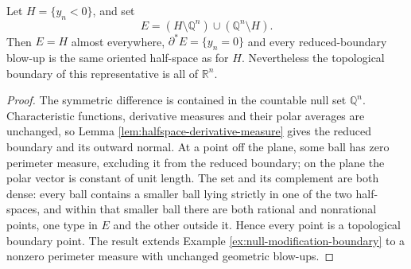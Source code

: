 \begin{example}\label{ex:halfspace-dense-modification}
Let $H=\{y_n<0\}$, and set
\[
 E=(H\setminus\mathbb Q^n)\cup(\mathbb Q^n\setminus H).
\]
Then $E=H$ almost everywhere, $\partial^*E=\{y_n=0\}$ and every reduced-boundary blow-up is the same oriented half-space as for $H$. Nevertheless the topological boundary of this representative is all of $\mathbb R^n$.
\end{example}
\begin{proof}
The symmetric difference is contained in the countable null set $\mathbb Q^n$. Characteristic functions, derivative measures and their polar averages are unchanged, so Lemma \ref{lem:halfspace-derivative-measure} gives the reduced boundary and its outward normal. At a point off the plane, some ball has zero perimeter measure, excluding it from the reduced boundary; on the plane the polar vector is constant of unit length. The set and its complement are both dense: every ball contains a smaller ball lying strictly in one of the two half-spaces, and within that smaller ball there are both rational and nonrational points, one type in $E$ and the other outside it. Hence every point is a topological boundary point. The result extends Example \ref{ex:null-modification-boundary} to a nonzero perimeter measure with unchanged geometric blow-ups.
\end{proof}
